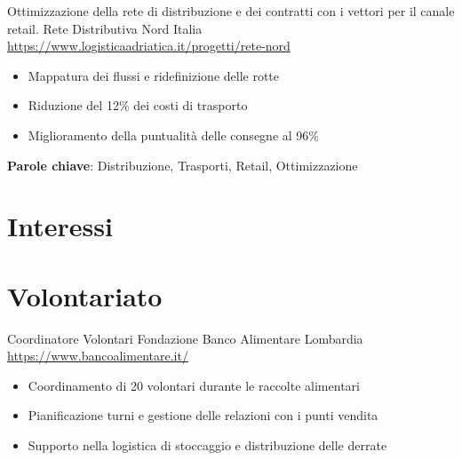 \documentclass[a4paper, serif, 10pt]{moderncv}
\begin{document}
        {Ottimizzazione della rete di distribuzione e dei contratti con i vettori per il canale retail.}
        {Rete Distributiva Nord Italia}
        {\url{https://www.logisticaadriatica.it/progetti/rete-nord}}
        {}
        {\begin{itemize}
\item Mappatura dei flussi e ridefinizione delle rotte
\item Riduzione del 12\% dei costi di trasporto
\item Miglioramento della puntualità delle consegne al 96\%
\end{itemize}
\textbf{Parole chiave}: Distribuzione, Trasporti, Retail, Ottimizzazione}
\section{Interessi}

\section{Volontariato}

        {Coordinatore Volontari}
        {Fondazione Banco Alimentare Lombardia}
        {\url{https://www.bancoalimentare.it/}}
        {}
        {\begin{itemize}
\item Coordinamento di 20 volontari durante le raccolte alimentari
\item Pianificazione turni e gestione delle relazioni con i punti vendita
\item Supporto nella logistica di stoccaggio e distribuzione delle derrate
\end{itemize}}
    
\end{document}
